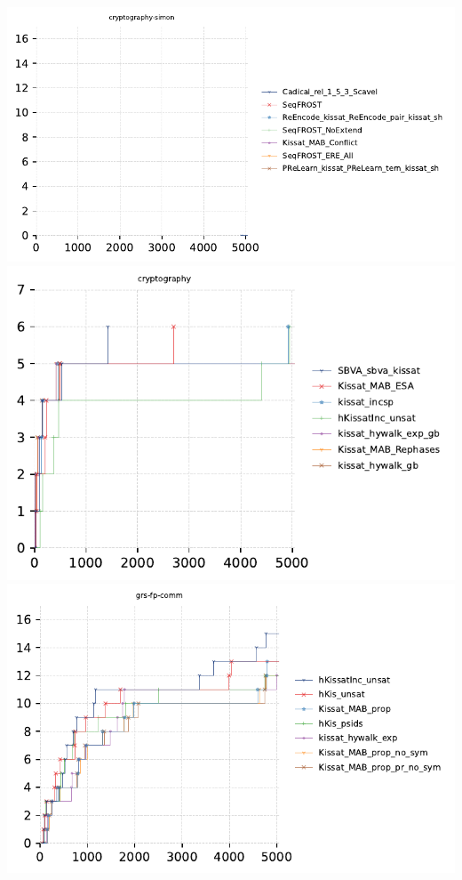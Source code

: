 \documentclass{article}
\begin{document}
\includegraphics[width=\linewidth]{gen/sc2023/cdfs/cdf-cryptography-simon.pdf}
\includegraphics[width=\linewidth]{gen/sc2023/cdfs/cdf-cryptography.pdf}
\includegraphics[width=\linewidth]{gen/sc2023/cdfs/cdf-grs-fp-comm.pdf}
\end{document}
